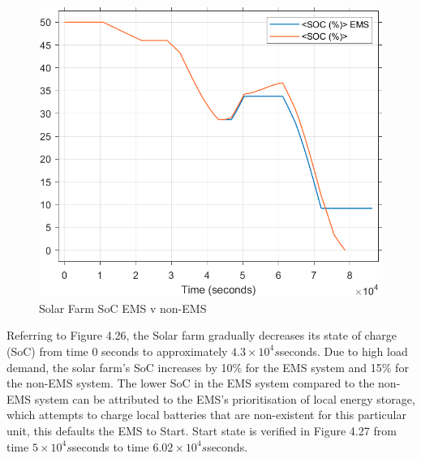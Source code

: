 \begin{figure}[H]
	\centering
	\includegraphics[totalheight=8cm]{Figures/solar farm soc ems v non-ems.png}
	\caption{Solar Farm SoC EMS v non-EMS}
\end{figure}
Referring to Figure 4.26, the Solar farm gradually decreases its state of charge (SoC) from time 0 seconds to approximately ${4.3\times10^4 s}$seconds. Due to high load demand, the solar farm's SoC increases by 10\% for the EMS system and 15\% for the non-EMS system. The lower SoC in the EMS system compared to the non-EMS system can be attributed to the EMS's prioritisation of local energy storage, which attempts to charge local batteries that are non-existent for this particular unit, this defaults the EMS to Start. Start state is verified in Figure 4.27 from time ${5\times10^4 s}$seconds to time ${6.02\times10^4 s}$seconds.\par


